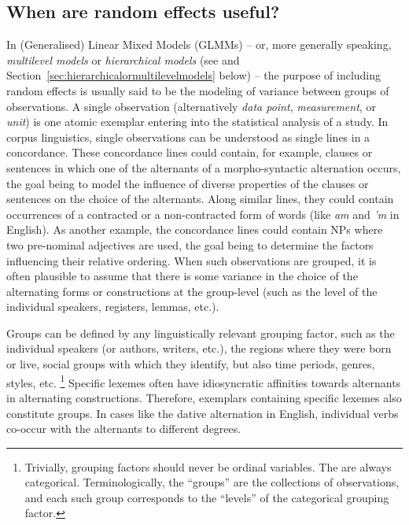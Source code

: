 \subsection{When are random effects useful?}
\label{sec:whenrandomeffectsareuseful}

In (Generalised) Linear Mixed Models (GLMMs) -- or, more generally speaking, \textit{multilevel models} or \textit{hierarchical models} (see \citealp{GelmanHill2006} and Section~\ref{sec:hierarchicalormultilevelmodels} below) -- the purpose of including random effects is usually said to be the modeling of variance between groups of observations.
A single observation (alternatively \textit{data point}, \textit{measurement}, or \textit{unit}) is one atomic exemplar entering into the statistical analysis of a study.
In corpus linguistics, single observations can be understood as single lines in a concordance.
These concordance lines could contain, for example, clauses or sentences in which one of the alternants of a morpho-syntactic alternation occurs, the goal being to model the influence of diverse properties of the clauses or sentences on the choice of the alternants.
Along similar lines, they could contain occurrences of a contracted or a non-contracted form of words (like \textit{am} and \textit{'m} in English).
As another example, the concordance lines could contain NPs where two pre-nominal adjectives are used, the goal being to determine the factors influencing their relative ordering.
When such observations are grouped, it is often plausible to assume that there is some variance in the choice of the alternating forms or constructions at the group-level (such as the level of the individual speakers, registers, lemmas, etc.).

Groups can be defined by any linguistically relevant grouping factor, such as the individual speakers (or authors, writers, etc.), the regions where they were born or live, social groups with which they identify, but also time periods, genres, styles, etc.%
\footnote{Trivially, grouping factors should never be ordinal variables.
The are always categorical.
Terminologically, the ``groups'' are the collections of observations, and each such group corresponds to the ``levels'' of the categorical grouping factor.}
Specific lexemes often have idiosyncratic affinities towards alternants in alternating constructions.
Therefore, exemplars containing specific lexemes also constitute groups.
In cases like the dative alternation in English, individual verbs co-occur with the alternants to different degrees.

